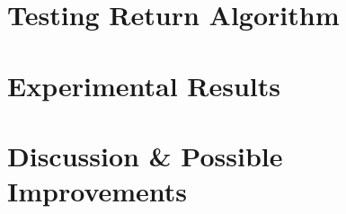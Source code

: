 \documentclass[11pt, a4paper]{article}
\begin{document}



\section{Testing Return Algorithm}




\section{Experimental Results}


\section{Discussion \& Possible Improvements}


\end{document}
